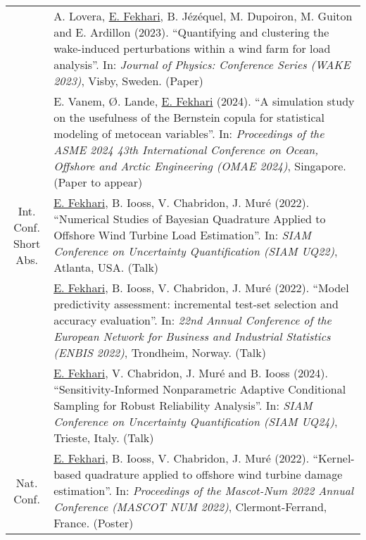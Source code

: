\begin{center}
\begin{tabularx}{\textwidth}{c X}
                    & A. Lovera, \underline{E. Fekhari}, B. J\'{e}z\'{e}quel, M. Dupoiron, M. Guiton and E. Ardillon (2023). 
                    ``Quantifying and clustering the wake-induced perturbations within a wind farm for load analysis''. 
                    In: \textit{Journal of Physics: Conference Series (WAKE 2023)}, Visby, Sweden. (Paper)\\
                    
                    & E. Vanem, \O{}. Lande, \underline{E. Fekhari} (2024). 
                    ``A simulation study on the usefulness of the Bernstein copula for statistical modeling of metocean variables''.
                    In: \textit{Proceedings of the ASME 2024 43th International Conference on Ocean, Offshore and Arctic Engineering (OMAE 2024)}, Singapore. (Paper to appear)\\
        \hline
\shortstack{Int. Conf.\\Short Abs.}  & \underline{E. Fekhari}, B. Iooss, V. Chabridon, J. Mur\'{e} (2022).
                    ``Numerical Studies of Bayesian Quadrature Applied to Offshore Wind Turbine Load Estimation''.
                    In: \textit{SIAM Conference on Uncertainty Quantification (SIAM UQ22)}, Atlanta, USA. (Talk)\\
        
                    & \underline{E. Fekhari}, B. Iooss, V. Chabridon, J. Mur\'{e} (2022). 
                    ``Model predictivity assessment: incremental test-set selection and accuracy evaluation''.
                    In: \textit{22nd Annual Conference of the European Network for Business and Industrial Statistics (ENBIS 2022)}, Trondheim, Norway. (Talk)\\

                    & \underline{E. Fekhari}, V. Chabridon, J. Mur\'{e} and B. Iooss (2024). 
                    ``Sensitivity-Informed Nonparametric Adaptive Conditional Sampling for Robust Reliability Analysis''. 
                    In: \textit{SIAM Conference on Uncertainty Quantification (SIAM UQ24)}, Trieste, Italy. (Talk)\\
        \hline
        Nat. Conf.  & \underline{E. Fekhari}, B. Iooss, V. Chabridon, J. Mur\'{e} (2022).
                    ``Kernel-based quadrature applied to offshore wind turbine damage estimation''. 
                    In: \textit{Proceedings of the Mascot-Num 2022 Annual Conference (MASCOT NUM 2022)}, Clermont-Ferrand, France. (Poster)\\
        

\end{tabularx}
\end{center}
